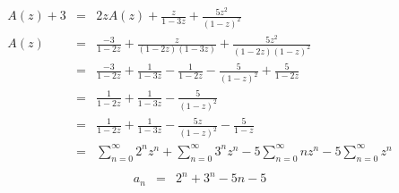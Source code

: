 \documentclass[12pt]{article}
\begin{document}
\begin{enumerate}
\begin{enumerate}
\begin{eqnarray*}
            A(z) + 3 &=& 2zA(z) + \frac{z}{1 - 3z} + \frac{5z^2}{(1 - z) ^ 2} \\
            A(z) &=& \frac{-3}{1 - 2z} + \frac{z}{(1 - 2z)(1 - 3z)} + \frac{5z^2}{(1 - 2z)(1 - z)^2} \\
            &=& \frac{-3}{1 - 2z} + \frac{1}{1 - 3z} - \frac{1}{1 - 2z} - \frac{5}{(1 - z)^2} + \frac{5}{1 - 2z} \\
            &=& \frac{1}{1 - 2z} + \frac{1}{1 - 3z} - \frac{5}{(1 - z)^2} \\
            &=& \frac{1}{1 - 2z} + \frac{1}{1 - 3z} - \frac{5z}{(1 - z)^2} - \frac{5}{1 - z} \\
            &=& \sum_{n=0}^{\infty}2^{n}z^{n} + \sum_{n=0}^{\infty}3^{n}z^{n} - 5\sum_{n=0}^{\infty}nz^{n} - 5\sum_{n=0}^{\infty}z^{n} \\
          \end{eqnarray*}
          \begin{eqnarray*}
            a_{n} &=& 2^{n} + 3^{n} - 5n - 5
          \end{eqnarray*}
      \end{enumerate}
  \end{enumerate}
\end{document}
